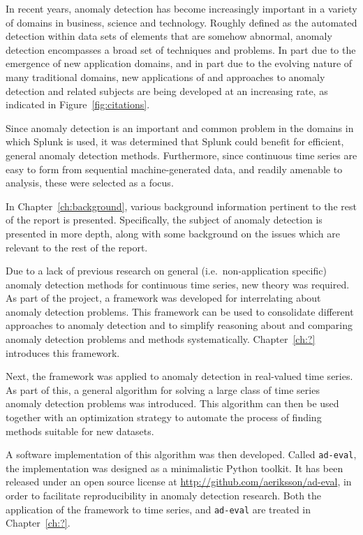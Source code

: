 In recent years, anomaly detection has become increasingly important in a variety of domains in business, science and technology. Roughly defined as the automated detection within data sets of elements that are somehow abnormal, anomaly detection encompasses a broad set of techniques and problems. In part due to the emergence of new application domains, and in part due to the evolving nature of many traditional domains, new applications of and approaches to anomaly detection and related subjects are being developed at an increasing rate, as indicated in Figure~\ref{fig:citations}.

Since anomaly detection is an important and common problem in the domains in which Splunk is used, it was determined that Splunk could benefit for efficient, general anomaly detection methods. Furthermore, since continuous time series are easy to form from sequential machine-generated data, and readily amenable to analysis, these were selected as a focus.

In Chapter~\ref{ch:background}, various background information pertinent to the rest of the report is presented. Specifically, the subject of anomaly detection is presented in more depth, along with some background on the issues which are relevant to the rest of the report.

Due to a lack of previous research on general (i.e.\ non-application specific) anomaly detection methods for continuous time series, new theory was required. As part of the project, a framework was developed for interrelating about anomaly detection problems. This framework can be used to consolidate different approaches to anomaly detection and to simplify reasoning about and comparing anomaly detection problems and methods systematically. Chapter~\ref{ch:?} introduces this framework.

Next, the framework was applied to anomaly detection in real-valued time series. As part of this, a general algorithm for solving a large class of time series anomaly detection problems was introduced. This algorithm can then be used together with an optimization strategy to automate the process of finding methods suitable for new datasets.

A software implementation of this algorithm was then developed. Called \texttt{ad-eval}, the implementation was designed as a minimalistic Python toolkit. It has been released under an open source license at \url{http://github.com/aeriksson/ad-eval}, in order to facilitate reproducibility in anomaly detection research. Both the application of the framework to time series, and \texttt{ad-eval} are treated in Chapter~\ref{ch:?}.

